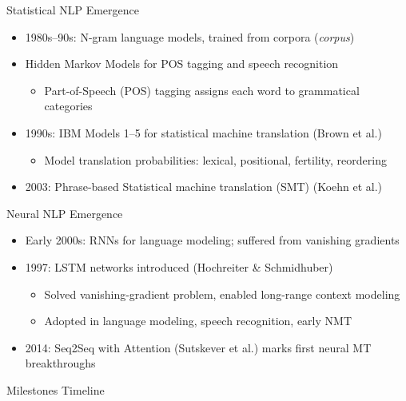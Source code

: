 \documentclass[german,10pt]{beamer}
\begin{document}
\begin{frame}{Statistical NLP Emergence}
  \begin{itemize}
    \item 1980s–90s: N-gram language models, trained from corpora (\textit{corpus})
    \item Hidden Markov Models for POS tagging and speech recognition
      \begin{itemize}
        \item Part-of-Speech (POS) tagging assigns each word to grammatical categories
      \end{itemize}
    \item 1990s: IBM Models 1–5 for statistical machine translation (Brown et al.)
      \begin{itemize}
        \item Model translation probabilities: lexical, positional, fertility, reordering
      \end{itemize}
    \item 2003: Phrase-based Statistical machine translation (SMT) (Koehn et al.)
  \end{itemize}
\end{frame}

\begin{frame}{Neural NLP Emergence}
  \begin{itemize}
    \item Early 2000s: RNNs for language modeling; suffered from vanishing gradients
    \item 1997: LSTM networks introduced (Hochreiter \& Schmidhuber)
      \begin{itemize}
        \item Solved vanishing-gradient problem, enabled long-range context modeling
        \item Adopted in language modeling, speech recognition, early NMT
      \end{itemize}
    \item 2014: Seq2Seq with Attention (Sutskever et al.) marks first neural MT breakthroughs
  \end{itemize}
\end{frame}

\begin{frame}{Milestones Timeline}
\end{frame}
\end{document}
